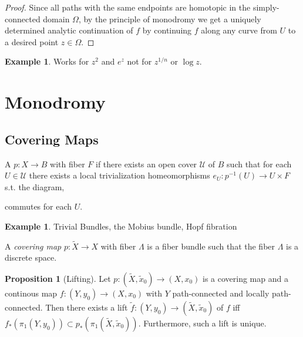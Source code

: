 \documentclass[12pt]{extarticle}
\theoremstyle{definition}
\newtheorem{proposition}[theorem]{Proposition}
\newtheorem{example}[theorem]{Example}
\newenvironment{definition}[1][Definition:]{\begin{trivlist}
\item[\hskip \labelsep {\bfseries #1}]}{\end{trivlist}}
\begin{document}
\begin{proof}
Since all paths with the same endpoints are homotopic in the simply-connected domain $\Omega$, by the principle of monodromy we get a uniquely determined analytic continuation of $f$ by continuing $f$ along any curve from $U$ to a desired point $z \in \Omega$. 
\end{proof}

\begin{example}
Works for $z^2$ and $e^z$ not for $z^{1/n}$ or $\log{z}$.
\end{example}

\section{Monodromy}

\subsection{Covering Maps}

\begin{definition}
A  $p : X \to B$ with fiber $F$ if there exists an open cover $\mathcal{U}$ of $B$ such that for each $U \in \mathcal{U}$ there exists a local trivialization homeomorphisms $e_U : p^{-1}(U) \to U \times F$ s.t. the diagram,
\begin{center}
\end{center} 
commutes for each $U$. 
\end{definition}

\begin{example}
Trivial Bundles, the Mobius bundle, Hopf fibration
\end{example}

\begin{definition}
A \textit{covering map} $p : \tilde{X} \to X$ with fiber $\Lambda$ is a fiber bundle  such that the fiber $\Lambda$ is a discrete space.  
\end{definition}

\begin{proposition}[Lifting]
Let $p : (\tilde{X}, \tilde{x}_0) \to (X, x_0)$ is a covering map and a continous map $f : (Y, y_0) \to (X, x_0)$ with $Y$ path-connected and locally path-connected. Then there exists a lift $\tilde{f} : (Y, y_0) \to (\tilde{X}, \tilde{x}_0)$ of $f$ iff $f_*(\pi_1(Y,y_0)) \subset p_*(\pi_1(\tilde{X}, \tilde{x}_0))$. Furthermore, such a lift is unique. 
\end{proposition}
\end{document}
